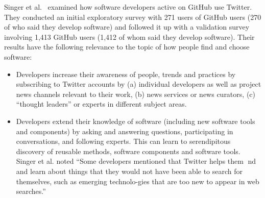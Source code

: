 \documentclass{casicswhitepaper}
\begin{document}
Singer et al.~\cite{singer2014software} examined how software developers active on GitHub use Twitter.  They conducted an initial exploratory survey with 271 users of GitHub users (270 of who said they develop software) and followed it up with a validation survey involving 1,413 GitHub users (1,412 of whom said they develop software).  Their results have the following relevance to the topic of how people find and choose software:
\begin{itemize}

\item Developers increase their awareness of people, trends and practices by subscribing to Twitter accounts by (a) individual developers as well as project news channels relevant to their work, (b) news services or news curators, (c) ``thought leaders'' or experts in different subject areas.  

\item Developers extend their knowledge of software (including new software tools and components) by asking and answering questions, participating in conversations, and following experts.  This can learn to serendipitous discovery of reusable methods, software components and software tools.  Singer et al. noted ``Some developers mentioned that Twitter helps them nd and learn about things that they would not have been able to search for themselves, such as emerging technolo-gies that are too new to appear in web searches.''

\end{itemize}
\end{document}
